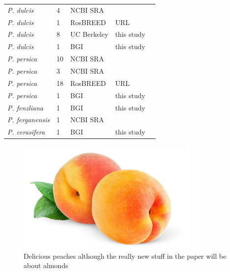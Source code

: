\documentclass[12pt]{article}
\begin{document}
{\begin{center}
\begin{longtable}{lllll}
                  {\em{P. dulcis}} &4 &NCBI SRA &\citealt{koepke2013comparative}\\
                  {\em{P. dulcis}} &1 &RosBREED &URL\\
                  {\em{P. dulcis}} &8 &UC Berkeley &this study \\
                  {\em{P. dulcis}} &1 &BGI &this study\\
                  {\em{P. persica}} &10 &NCBI SRA &\citealt{verde2013high} \\ %
                  {\em{P. persica}} &3 &NCBI SRA &\citealt{ahmad2011whole} \\ %
                  {\em{P. persica}} &18 &RosBREED &URL \\ %
                  {\em{P. persica}} &1 &BGI &this study \\ %
                 {\em{P. fenzliana}} &1 &BGI &this study\\
                 {\em{P. ferganensis}} &1 &NCBI SRA &\citealt{verde2013high}\\
                 {\em{P. cerasifera}} &1 &BGI &this study\\ \hline

\end{longtable}
\end{center}



\begin{figure}[b]
\centering
   \includegraphics[width=0.8\textwidth]{peachzdfgad.jpg}
  \caption{Delicious peaches although the really new stuff in the paper will be about almonds}
  \label{fig:peach}
\end{figure}



}
\end{document}

